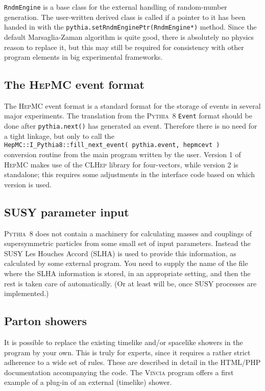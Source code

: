 \documentclass{elsartmod}
\begin{document}
\texttt{RndmEngine} is a base class for the external handling of 
random-number generation. The user-written derived class is called 
if a pointer to it has been handed in with the 
\texttt{pythia.setRndmEnginePtr(RndmEngine*)} method. 
Since the default Marsaglia-Zaman algorithm is quite good, there is
absolutely no physics reason to replace it, but this may still be 
required for consistency with other program elements in big 
experimental frameworks.

\subsection{The \textsc{HepMC} event format}

The \textsc{HepMC} event format \cite{hepmc} is a standard format
for the storage of events in several major experiments. The translation
from the \textsc{Pythia}~8 \texttt{Event} format should be done
after \texttt{pythia.next()} has generated an event. Therefore there
is no need for a tight linkage, but only to call the\\ 
\texttt{HepMC::I\_Pythia8::fill\_next\_event( pythia.event, hepmcevt )}\\ 
conversion routine from the main program written by the user.
Version 1 of \textsc{HepMC} makes use of the \textsc{CLHep} library
\cite{clhep} for four-vectors, while version 2 is standalone; this 
requires some adjustments in the interface code based on which version 
is used.

\subsection{SUSY parameter input}

\textsc{Pythia}~8 does not contain a machinery for calculating 
masses and couplings of supersymmetric particles from some small set
of input parameters. Instead the SUSY Les Houches Accord (SLHA)
\cite{slha} is used to provide this information, as calculated by 
some external program. You need to supply the name of the file where 
the SLHA information is stored, in an appropriate setting, and then 
the rest is taken care of automatically. (Or at least will be, once
SUSY processes are implemented.)

\subsection{Parton showers}
 
It is possible to replace the existing timelike and/or spacelike showers
in the program by your own. This is truly for experts, since it requires
a rather strict adherence to a wide set of rules. These are described
in detail in the HTML/PHP documentation accompanying the code. 
The \textsc{Vincia} program \cite{vincia} offers a first example of
a plug-in of an external (timelike) shower. 
\end{document}
